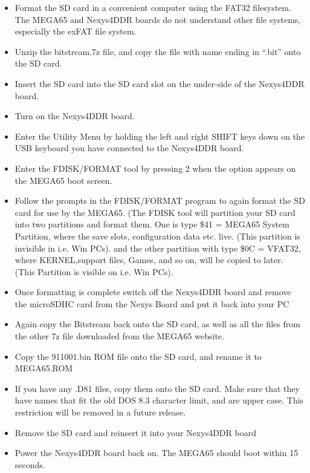\begin{itemize}
  \item{Format the SD card}  in a convenient computer using the FAT32 filesystem.  The MEGA65 and Nexys4DDR boards do not understand other
file systems, especially the exFAT file system.
\item{Unzip} the bitstream.7z file, and copy the file with name ending in ``.bit'' onto the SD card.
\item{Insert} the SD card into the SD card slot on the under-side of the Nexys4DDR board.
\item{Turn on} the Nexys4DDR board.
\item{Enter the Utility Menu} by holding the left and right SHIFT keys down on the USB keyboard you have connected to the Nexys4DDR board.
\item{Enter the FDISK/FORMAT tool} by pressing 2 when the option appears on the MEGA65 boot screen.
\item{Follow the prompts} in the FDISK/FORMAT program to again format the SD card for use by the MEGA65.
  (The FDISK tool will partition your SD card into two partitions and format them. 
  One is type \$41 = MEGA65 System Partition, where the save slots, configuration data etc. live. 
  (This partition is invisible in i.e. Win PCs).
  and the other partition with type \$0C = VFAT32, where KERNEL,support files, Games, and so on, will be copied to later.
  (This Partition is visible on i.e. Win PCs).
\item{Once formatting is complete} switch off the Nexys4DDR board and remove the microSDHC card from the Nexys Board and put it back into your PC
\item{Again copy} the Bitstream back onto the SD card, as well as all the files from the other 7z file downloaded from the MEGA65 website.
\item{Copy the 911001.bin} ROM file onto the SD card, and rename it to MEGA65.ROM
\item{If you have any .D81 files}, copy them onto the SD card. Make sure that they have names that fit the old DOS 8.3 character limit, and are upper case.  This restriction will be removed in a future release.
\item{Remove the SD card} and reinsert it into your Nexys4DDR board
\item{Power the Nexys4DDR} board back on.  The MEGA65 should boot within 15 seconds.
\end{itemize}



